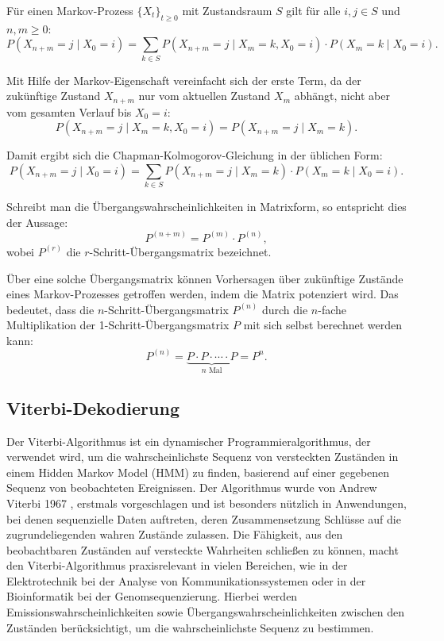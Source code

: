 Für einen Markov-Prozess $\{X_t\}_{t \geq 0}$ mit Zustandsraum $S$ gilt für alle $i, j \in S$ und $n, m \geq 0$:
\begin{equation}
P(X_{n+m} = j \mid X_0 = i) = \sum_{k \in S} P(X_{n+m} = j \mid X_m = k, X_0 = i) \cdot P(X_m = k \mid X_0 = i).
\end{equation}

Mit Hilfe der Markov-Eigenschaft vereinfacht sich der erste Term, da der zukünftige Zustand $X_{n+m}$ nur vom aktuellen Zustand $X_m$ abhängt, nicht aber vom gesamten Verlauf bis $X_0 = i$:
\begin{equation}
P(X_{n+m} = j \mid X_m = k, X_0 = i) = P(X_{n+m} = j \mid X_m = k).
\end{equation}

Damit ergibt sich die Chapman-Kolmogorov-Gleichung in der üblichen Form:
\begin{equation}
P(X_{n+m} = j \mid X_0 = i) = \sum_{k \in S} P(X_{n+m} = j \mid X_m = k) \cdot P(X_m = k \mid X_0 = i).
\end{equation}

Schreibt man die Übergangswahrscheinlichkeiten in Matrixform, so entspricht dies der Aussage:
\begin{equation}
P^{(n+m)} = P^{(m)} \cdot P^{(n)},
\end{equation}
wobei $P^{(r)}$ die $r$-Schritt-Übergangsmatrix bezeichnet.

Über eine solche Übergangsmatrix können Vorhersagen über zukünftige Zustände eines Markov-Prozesses getroffen werden, indem die Matrix potenziert wird.
Das bedeutet, dass die $n$-Schritt-Übergangsmatrix $P^{(n)}$ durch die $n$-fache Multiplikation der 1-Schritt-Übergangsmatrix $P$ mit sich selbst berechnet werden kann:
\begin{equation}
P^{(n)} = \underbrace{P \cdot P \cdot \cdots \cdot P}_{n \text{ Mal}} = P^n.
\end{equation} 


\subsection{Viterbi-Dekodierung}

Der Viterbi-Algorithmus ist ein dynamischer Programmieralgorithmus, der verwendet wird, um die wahrscheinlichste Sequenz von versteckten Zuständen in einem Hidden Markov Model (HMM) zu finden, basierend auf einer gegebenen Sequenz von beobachteten Ereignissen. Der Algorithmus wurde von Andrew Viterbi 1967 \citet{viterbierror},
erstmals vorgeschlagen und ist besonders nützlich in Anwendungen, bei denen sequenzielle Daten auftreten, deren Zusammensetzung Schlüsse auf die zugrundeliegenden wahren Zustände zulassen. Die Fähigkeit, aus den beobachtbaren Zuständen auf versteckte Wahrheiten schließen zu können, macht den Viterbi-Algorithmus praxisrelevant in vielen Bereichen, wie in der Elektrotechnik bei der Analyse von Kommunikationssystemen oder in der Bioinformatik bei der Genomsequenzierung.
Hierbei werden Emissionswahrscheinlichkeiten sowie Übergangswahrscheinlichkeiten zwischen den Zuständen berücksichtigt, um die wahrscheinlichste Sequenz zu bestimmen.

